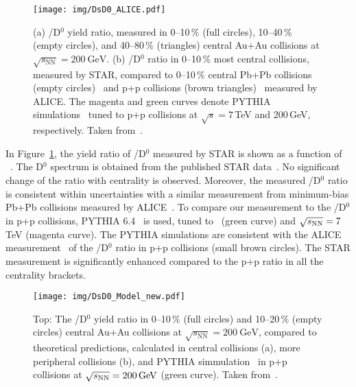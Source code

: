 \begin{figure}[!htb]
\begin{center}
  \texttt{[image: img/DsD0\_ALICE.pdf]}\\
\end{center} 
\caption[The ratio between \Ds\ and D$^0$ yield in
Au+Au collisions, compared to p+p and Pb+Pb collisions.]{\label{Ds}(a) \Ds/D$^0$ yield ratio, measured in 0--10$\,\%$ (full circles), 10--40$\,\%$ (empty circles), and 40--80$\,\%$ (triangles) central Au+Au
collisions at $\sqrt{s_\mathrm{NN}} = \SI{200}{\giga\electronvolt}$\@. (b) \Ds/D$^0$ ratio in 0--10$\,\%$ most central collisions, measured by STAR, compared to 0--10$\,\%$ central Pb+Pb collisions (empty circles)~\cite{AliceDs2018} and p+p collisions (brown triangles)~\cite{AliceDsPP} measured by ALICE\@. The magenta and green curves denote PYTHIA simulations~\cite{PYTHIA} tuned to p+p collisions at $\sqrt{s} = 7\,$TeV and 200$\,$GeV, respectively\@. Taken from~\cite{DsPaper}\@.}
\end{figure}

In Figure~\ref{Ds}, the yield ratio of
\Ds/D$^0$ measured by STAR is shown as a function of \pt~\cite{DsPaper}\@. The D$^0$ spectrum is obtained from the published STAR 
data~\cite{D0paper}\nocite{DavidThesis}\@. No significant change of the ratio with centrality is observed. Moreover, the measured \Ds/D$^0$
ratio is consistent within uncertainties with a similar measurement from minimum-bias Pb+Pb collisions  measured by ALICE~\cite{AliceDs2018}\@. 
To compare our measurement to the \Ds/D$^0$ in p+p collisions, 
PYTHIA 6.4~\cite{PYTHIA} is used, tuned to \snnFull\ (green curve) and $\sqrt{s_\text{NN}} = 7\,$TeV (magenta curve)\@. The PYTHIA simulations are consistent with the ALICE measurement~\cite{AliceDsPP} of the \Ds/D$^0$ ratio in p+p collisions (small brown circles)\@. The STAR measurement is significantly
enhanced compared to the p+p ratio in all the centrality brackets. 

\begin{figure}[!htb]
\begin{center}
  \texttt{[image: img/DsD0\_Model\_new.pdf]}\\
\end{center} 
\caption[The \Ds/D$^0$ yield ratio in
Au+Au collisions, compared to theoretical calculations.]{\label{DsModels}Top: The \Ds/D$^0$ yield ratio in
0--10$\,\%$ (full circles) and 10--20$\,\%$ (empty circles) central Au+Au collisions at $\sqrt{s_\mathrm{NN}} = \SI{200}{\giga\electronvolt}$, compared to theoretical predictions, calculated in central collisions (a), more peripheral collisions (b), and PYTHIA simmulation~\cite{PYTHIA} in p+p collisions at $\sqrt{s_\text{NN}} = \SI{200}{\giga\electronvolt}$ (green curve)\@. Taken from~\cite{DsPaper}\@.}
\end{figure}

